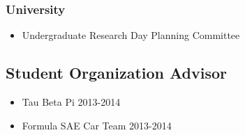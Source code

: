 \subsubsection*{University}
\begin{itemize}
\item Undergraduate Research Day Planning Committee
\end{itemize}

\subsection*{Student Organization Advisor}
\begin{itemize}
\item Tau Beta Pi 2013-2014
\item Formula SAE Car Team 2013-2014
\end{itemize}



